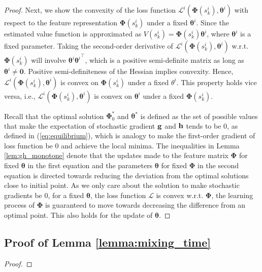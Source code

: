 \documentclass{article} %
\def\eqref#1{equation~\ref{#1}}
\theoremstyle{plain}
\theoremstyle{definition}
\theoremstyle{remark}
\renewcommand{\eqref}[1]{(\ref{#1})}
\begin{document}
{\begin{proof}
Next, we show the convexity of the loss function $\mathcal{L}^i(\pmb{\Phi}(s_k^i), \pmb{\theta}^i)$ with respect to the feature representation $\pmb{\Phi}(s_k^i)$ under a fixed $\pmb{\theta}^i$. Since the estimated value function is approximated as $V(s_k^i) = \pmb{\Phi}(s_k^i)\pmb{\theta}^i$, where $\pmb{\theta}^i$ is a fixed parameter. Taking the second-order derivative of $\mathcal{L}^i(\pmb{\Phi}(s_k^i), \pmb{\theta}^i)$ w.r.t. $\pmb{\Phi}(s_k^i)$ will involve $\pmb{\theta}^i {\pmb{\theta}^{i}}^\intercal$, which is a positive semi-definite matrix as long as $\pmb{\theta}^i \neq \pmb{0}$. Positive semi-definiteness of the Hessian implies convexity. Hence, $\mathcal{L}^i(\pmb{\Phi}(s_k^i), \pmb{\theta}^i)$ is convex on $\pmb{\Phi}(s_k^i)$ under a fixed $\theta^i$. This property holds vice versa, i.e., $\mathcal{L}^i(\pmb{\Phi}(s_k^i), \pmb{\theta}^i)$ is convex on $\pmb{\theta}^i$ under a fixed $\pmb{\Phi}(s_k^i)$.

Recall that the optimal solution $\pmb{\Phi}_0^*$ and $\pmb{\theta}^*$ is defined as the set of possible values that make the expectation of stochastic gradient ${\mathbf{g}}$ and $\mathbf{h}$ tends to be 0, as defined in \eqref{eq:equilibrium}, which is analogy to make the first-order gradient of loss function be 0 and achieve the local minima. The inequalities in Lemma \ref{lem:gh_monotone} denote that the updates made to the feature matrix $\pmb{\Phi}$ for fixed $\pmb{\theta}$ in the first equation and the parameters $\pmb{\theta}$ for fixed $\pmb{\Phi}$ in the second equation is directed towards reducing the deviation from the optimal solutions close to initial point. As we only care about the solution to make stochastic gradients be 0, for a fixed $\pmb{\theta}$, the loss function $\mathcal{L}$ is convex w.r.t. $\pmb{\Phi}$, the learning process of $\pmb{\Phi}$ is guaranteed to move towards decreasing the difference from an optimal point. This also holds for the update of $\pmb{\theta}$.
\end{proof}


\subsection{Proof of Lemma \ref{lemma:mixing_time}}
 \begin{proof}
 

\end{proof}}
\end{document}
